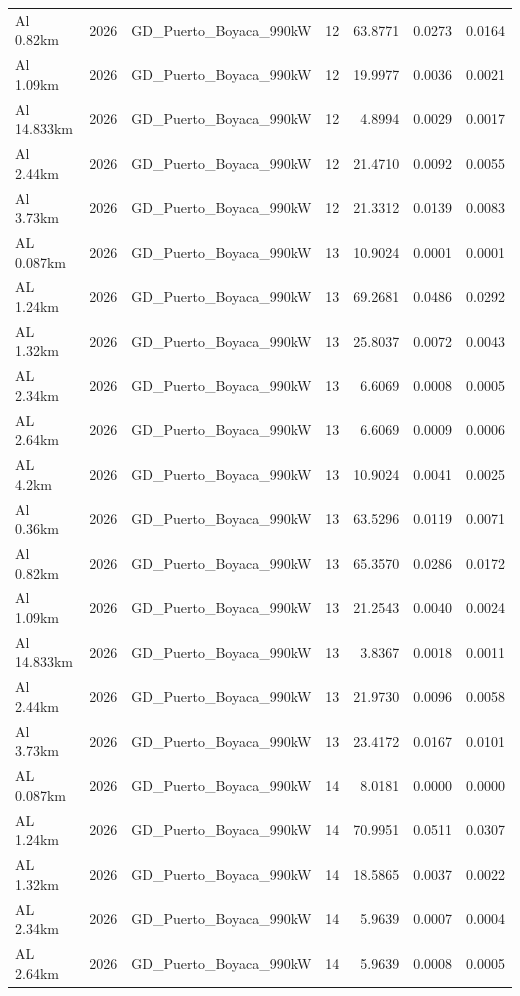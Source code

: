 \documentclass[11pt,a4paper]{article}
\begin{document}
\begin{longtable}{llllrrr}
Al 0.82km & 2026 & GD\_Puerto\_Boyaca\_990kW & 12 & 63.8771 & 0.0273 & 0.0164 \\
Al 1.09km & 2026 & GD\_Puerto\_Boyaca\_990kW & 12 & 19.9977 & 0.0036 & 0.0021 \\
Al 14.833km & 2026 & GD\_Puerto\_Boyaca\_990kW & 12 & 4.8994 & 0.0029 & 0.0017 \\
Al 2.44km & 2026 & GD\_Puerto\_Boyaca\_990kW & 12 & 21.4710 & 0.0092 & 0.0055 \\
Al 3.73km & 2026 & GD\_Puerto\_Boyaca\_990kW & 12 & 21.3312 & 0.0139 & 0.0083 \\
AL 0.087km & 2026 & GD\_Puerto\_Boyaca\_990kW & 13 & 10.9024 & 0.0001 & 0.0001 \\
AL 1.24km & 2026 & GD\_Puerto\_Boyaca\_990kW & 13 & 69.2681 & 0.0486 & 0.0292 \\
AL 1.32km & 2026 & GD\_Puerto\_Boyaca\_990kW & 13 & 25.8037 & 0.0072 & 0.0043 \\
AL 2.34km & 2026 & GD\_Puerto\_Boyaca\_990kW & 13 & 6.6069 & 0.0008 & 0.0005 \\
AL 2.64km & 2026 & GD\_Puerto\_Boyaca\_990kW & 13 & 6.6069 & 0.0009 & 0.0006 \\
AL 4.2km & 2026 & GD\_Puerto\_Boyaca\_990kW & 13 & 10.9024 & 0.0041 & 0.0025 \\
Al 0.36km & 2026 & GD\_Puerto\_Boyaca\_990kW & 13 & 63.5296 & 0.0119 & 0.0071 \\
Al 0.82km & 2026 & GD\_Puerto\_Boyaca\_990kW & 13 & 65.3570 & 0.0286 & 0.0172 \\
Al 1.09km & 2026 & GD\_Puerto\_Boyaca\_990kW & 13 & 21.2543 & 0.0040 & 0.0024 \\
Al 14.833km & 2026 & GD\_Puerto\_Boyaca\_990kW & 13 & 3.8367 & 0.0018 & 0.0011 \\
Al 2.44km & 2026 & GD\_Puerto\_Boyaca\_990kW & 13 & 21.9730 & 0.0096 & 0.0058 \\
Al 3.73km & 2026 & GD\_Puerto\_Boyaca\_990kW & 13 & 23.4172 & 0.0167 & 0.0101 \\
AL 0.087km & 2026 & GD\_Puerto\_Boyaca\_990kW & 14 & 8.0181 & 0.0000 & 0.0000 \\
AL 1.24km & 2026 & GD\_Puerto\_Boyaca\_990kW & 14 & 70.9951 & 0.0511 & 0.0307 \\
AL 1.32km & 2026 & GD\_Puerto\_Boyaca\_990kW & 14 & 18.5865 & 0.0037 & 0.0022 \\
AL 2.34km & 2026 & GD\_Puerto\_Boyaca\_990kW & 14 & 5.9639 & 0.0007 & 0.0004 \\
AL 2.64km & 2026 & GD\_Puerto\_Boyaca\_990kW & 14 & 5.9639 & 0.0008 & 0.0005 \\

\end{longtable}
\end{document}
